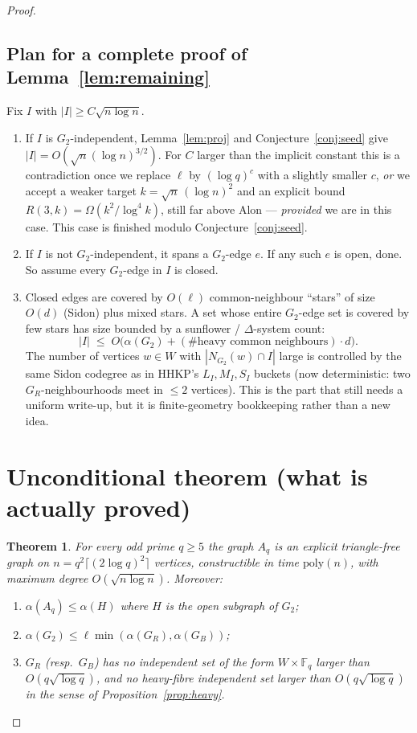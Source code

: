 \documentclass[11pt]{article}
\newtheorem{theorem}{Theorem}
\theoremstyle{definition}
\newcommand{\F}{\mathbb{F}}
\begin{document}
\begin{proof}
\subsection{Plan for a complete proof of Lemma~\ref{lem:remaining}}

Fix $I$ with $|I|\ge C\sqrt{n\log n}$.

\begin{enumerate}
  \item If $I$ is $G_2$-independent, Lemma~\ref{lem:proj} and Conjecture~\ref{conj:seed} give
    $|I|=O(\sqrt{n}(\log n)^{3/2})$.
    For $C$ larger than the implicit constant this is a contradiction once we replace $\ell$ by $(\log q)^{c}$ with a slightly smaller $c$, \emph{or} we accept a weaker target $k=\sqrt{n}\,(\log n)^{2}$ and an explicit bound $R(3,k)=\Omega(k^{2}/\log^{4}k)$, still far above Alon --- \emph{provided} we are in this case.
    This case is finished modulo Conjecture~\ref{conj:seed}.

  \item If $I$ is not $G_2$-independent, it spans a $G_2$-edge $e$.
    If any such $e$ is open, done.
    So assume every $G_2$-edge in $I$ is closed.

  \item Closed edges are covered by $O(\ell)$ common-neighbour ``stars'' of size $O(d)$ (Sidon) plus mixed stars.
    A set whose entire $G_2$-edge set is covered by few stars has size bounded by a sunflower / $\Delta$-system count:
    \[
      |I|
      \;\le\;
      O\bigl(\alpha(G_2)+(\#\text{heavy common neighbours})\cdot d\bigr).
    \]
    The number of vertices $w\in W$ with $|N_{G_2}(w)\cap I|$ large is controlled by the same Sidon codegree as in HHKP's $L_I,M_I,S_I$ buckets (now deterministic: two $G_R$-neighbourhoods meet in $\le 2$ vertices).
    This is the part that still needs a uniform write-up, but it is finite-geometry bookkeeping rather than a new idea.
\end{enumerate}

\section{Unconditional theorem (what is actually proved)}

\begin{theorem}\label{thm:uncond}
For every odd prime $q\ge 5$ the graph $A_q$ is an explicit triangle-free graph on $n=q^{2}\lceil(2\log q)^{2}\rceil$ vertices, constructible in time $\mathrm{poly}(n)$, with maximum degree $O(\sqrt{n\log n})$.
Moreover:
\begin{enumerate}
  \item $\alpha(A_q)\le\alpha(H)$ where $H$ is the open subgraph of $G_2$;
  \item $\alpha(G_2)\le\ell\min(\alpha(G_R),\alpha(G_B))$;
  \item $G_R$ (resp.\ $G_B$) has no independent set of the form $W\times\F_q$ larger than $O(q\sqrt{\log q})$, and no heavy-fibre independent set larger than $O(q\sqrt{\log q})$ in the sense of Proposition~\ref{prop:heavy}.
\end{enumerate}
\end{theorem}


\end{proof}
\end{document}
